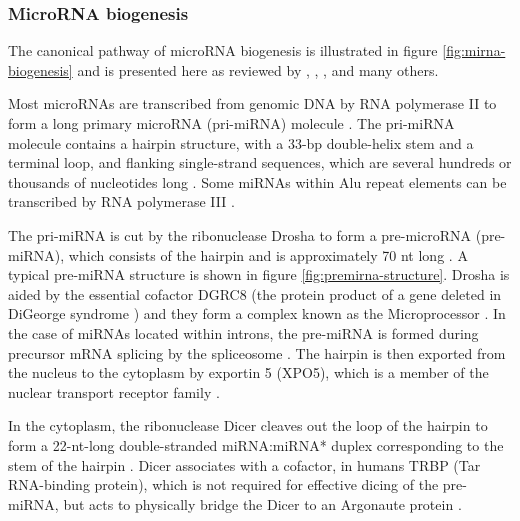 





\subsubsection{MicroRNA biogenesis}\label{microrna-biogenesis}

The canonical pathway of microRNA biogenesis is illustrated in figure
\ref{fig:mirna-biogenesis} and is presented here as reviewed by \citet{Bartel2004},
\citet{Melo2011}, \citet{Ha2014}, and many others. 

Most microRNAs are transcribed from genomic DNA by RNA polymerase II to form a
long primary microRNA (pri-miRNA) molecule \citep{Lee2004}. The pri-miRNA molecule
contains a hairpin structure, with a 33-bp double-helix stem and a terminal
loop, and flanking single-strand sequences, which are several hundreds or
thousands of nucleotides long \citep{Kim2005}. Some miRNAs within Alu repeat elements
can be transcribed by RNA polymerase III \citep{Borchert2006}.

The pri-miRNA is cut by the ribonuclease Drosha to form %
a pre-microRNA (pre-miRNA), which consists of the hairpin and is
approximately 70 nt long \citep{Lee2003}. A typical pre-miRNA structure is
shown in figure \ref{fig:premirna-structure}. Drosha is aided by the essential
cofactor DGRC8 (the protein product of a gene deleted in DiGeorge syndrome \citep{Shiohama2003})
and they form a complex known as the Microprocessor \citep{Gregory2004}. In
the case of miRNAs located within introns, the pre-miRNA is formed during
precursor mRNA splicing by the spliceosome \citep{Ruby2007}. The hairpin is
then exported from the nucleus to the cytoplasm by exportin 5 (XPO5), which is
a member of the nuclear transport receptor family \citep{Lund2004}.

In the cytoplasm, the ribonuclease Dicer cleaves out the loop of the hairpin
to form a 22-nt-long double-stranded miRNA:miRNA* duplex corresponding to
the stem of the hairpin \citep{Bernstein2001}.
Dicer associates with a cofactor, in humans TRBP (Tar RNA-binding protein),
which is not required for effective dicing of the pre-miRNA,
but acts to physically bridge the Dicer to an Argonaute protein
\citep{Chendrimada2005}.

